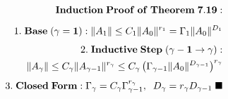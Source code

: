 \documentclass[preview]{standalone}
\begin{document}
\begin{align*}
\special{dvisvgm:raw <g id='unique000'>}\mathbf{Induction\;Proof\;of\;Theorem\;7.19:}\\[5pt]1.\;\mathbf{Base\;(\gamma=1):}\;\|A_1\| \le C_1\|A_0\|^{r_1} = \Gamma_1\|A_0\|^{D_1}\\[4pt]2.\;\mathbf{Inductive\;Step\;(\gamma-1\to\gamma):}\\\;\;\|A_\gamma\| \le C_\gamma\|A_{\gamma-1}\|^{r_\gamma} \le C_\gamma\left(\Gamma_{\gamma-1}\|A_0\|^{D_{\gamma-1}}\right)^{r_\gamma}\\[4pt]3.\;\mathbf{Closed\;Form:}\;\Gamma_\gamma = C_\gamma \Gamma_{\gamma-1}^{r_\gamma},\;\;D_\gamma = r_\gamma D_{\gamma-1}\;\blacksquare\special{dvisvgm:raw </g>}
\end{align*}
\end{document}
